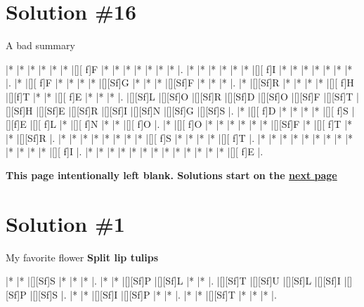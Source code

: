 \documentclass[letterpaper]{article}
\begin{document}
\section*{Solution \#16}
A bad summary

\vspace*{1em}
\begin{Puzzle}{14}{10}
|*        |*        |*        |*        |*        |*        |[][ f]F  |*        |*        |*        |*        |*        |*        |*        |.
|*        |*        |*        |*        |*        |*        |[][ f]I  |*        |*        |*        |*        |*        |*        |*        |.
|*        |[][ f]F  |*        |*        |*        |*        |[][Sf]G  |*        |*        |*        |[][Sf]F  |*        |*        |*        |.
|*        |[][Sf]R  |*        |*        |*        |*        |[][ f]H  |[][f]T   |*        |*        |[][ f]E  |*        |*        |*        |.
|[][Sf]L  |[][Sf]O  |[][Sf]R  |[][Sf]D  |[][Sf]O  |[][Sf]F  |[][Sf]T  |[][Sf]H  |[][Sf]E  |[][Sf]R  |[][Sf]I  |[][Sf]N  |[][Sf]G  |[][Sf]S  |.
|*        |[][ f]D  |*        |*        |*        |*        |[][ f]S  |[][f]E   |[][ f]L  |*        |[][ f]N  |*        |*        |[][ f]O  |.
|*        |[][ f]O  |*        |*        |*        |*        |*        |*        |[][Sf]F  |*        |[][ f]T  |*        |*        |[][Sf]R  |.
|*        |*        |*        |*        |*        |*        |*        |*        |[][ f]S  |*        |*        |*        |*        |[][ f]T  |.
|*        |*        |*        |*        |*        |*        |*        |*        |*        |*        |*        |*        |*        |[][ f]I  |.
|*        |*        |*        |*        |*        |*        |*        |*        |*        |*        |*        |*        |*        |[][ f]E  |.
\end{Puzzle}

\newpage
\begin{center}
\textbf{This page intentionally left blank. Solutions start on the \hyperlink{solstart}{next page}}
\end{center}

\newpage

\hypertarget{solstart}{}
\section*{Solution \#1}
My favorite flower
\newline\textbf{Split lip tulips}

\vspace*{1em}
\begin{Puzzle}{6}{5}
|*        |*        |[][Sf]S  |*        |*        |*        |.
|*        |*        |[][Sf]P  |[][Sf]L  |*        |*        |.  
|[][Sf]T  |[][Sf]U  |[][Sf]L  |[][Sf]I  |[][Sf]P  |[][Sf]S  |.
|*        |*        |[][Sf]I  |[][Sf]P  |*        |*        |.
|*        |*        |[][Sf]T  |*        |*        |*        |.
\end{Puzzle}
\end{document}
